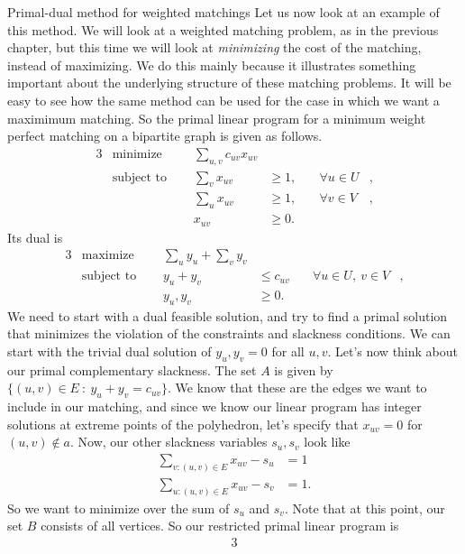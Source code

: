 \begin{section}{Primal-dual method for weighted matchings}
	Let us now look at an example of this method. We will look at a weighted matching problem, as 
	in the previous chapter, but this time we will look at \emph{minimizing} the cost of the 
	matching, instead of maximizing. We do this mainly because it illustrates something important 
	about the underlying structure of these matching problems. It will be easy to see how the 
	same method can be used for the case in which we want a maximimum matching. So the primal 
	linear program for a minimum weight perfect matching on a bipartite graph is given as follows. 
	\begin{alignat}{3}
		& \text{minimize } & \sum_{u,v} c_{uv} x_{uv}& \\
		& \text{subject to } \quad & \sum_{v} x_{uv} & \geq 1, & \quad \forall u\in U&, \\
				     &\quad & \sum_{u} x_{uv} & \geq 1, & \quad \forall v\in V &, \\
				&& x_{uv} & \geq 0.
	\end{alignat}
	Its dual is
	\begin{alignat}{3}
		& \text{maximize } & \sum_{u}y_u + \sum_{v}y_v & \\
		& \text{subject to } \quad & y_u + y_v & \leq c_{uv} & \quad \forall 
					u\in U,\ v\in V &, \\
				    && y_u,y_v & \geq 0.
	\end{alignat}
	We need to start with a dual feasible solution, and try to find a primal solution that 
	minimizes the violation of the constraints and slackness conditions. We can start with the 
	trivial dual solution of $y_u,y_v = 0$ for all $u,v$. Let's now think about our primal 
	complementary slackness. The set $A$ is given by $\{(u,v)\in E\ :\ y_u + y_v = c_{uv}\}$. 
	We know that these are the edges we want to include in our matching, and since we know our 
	linear program has integer solutions at extreme points of the polyhedron, let's specify that 
	$x_{uv} = 0$ for $(u,v)\notin a$. Now, our other slackness variables $s_u,s_v$ look like 
	\begin{align*}
		\sum_{v:(u,v)\in E} x_{uv} - s_u &= 1 \\
		\sum_{u:(u,v)\in E} x_{uv} - s_v &= 1.
	\end{align*}
	So we want to minimize over the sum of $s_u$ and $s_v$. Note that at this point, our set $B$ 
	consists of all vertices. So our restricted primal linear program is
	\begin{alignat}{3}

\end{alignat}
\end{section}
